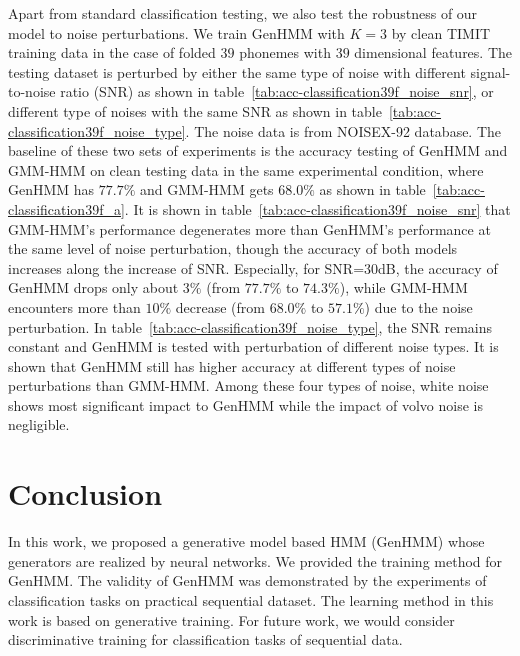 \documentclass{ecai}
\begin{document}
Apart from standard classification testing, we also test the robustness of our model to noise perturbations. We train GenHMM with $K=3$ by clean TIMIT training data in the case of folded $39$ phonemes with $39$ dimensional features. The testing dataset is perturbed by either the same type of noise with different signal-to-noise ratio (SNR) as shown in table~\ref{tab:acc-classification39f_noise_snr}, or different type of noises with the same SNR as shown in table~\ref{tab:acc-classification39f_noise_type}. The noise data is from NOISEX-92 database. The baseline of these two sets of experiments is the accuracy testing of GenHMM and GMM-HMM on clean testing data in the same experimental condition, where GenHMM has $77.7\%$ and GMM-HMM gets $68.0\%$ as shown in table~\ref{tab:acc-classification39f_a}. It is shown in table~\ref{tab:acc-classification39f_noise_snr} that GMM-HMM's performance degenerates more than GenHMM's performance at the same level of noise perturbation, though the accuracy of both models increases along the increase of SNR. Especially, for SNR=$30$dB, the accuracy of GenHMM drops only about $3\%$ (from $77.7\%$ to $74.3\%$), while GMM-HMM encounters more than $10\%$ decrease (from $68.0\%$ to $57.1\%$) due to the noise perturbation. In table~\ref{tab:acc-classification39f_noise_type}, the SNR remains constant and GenHMM is tested with perturbation of different noise types. It is shown that GenHMM still has higher accuracy at different types of noise perturbations than GMM-HMM. Among these four types of noise, white noise shows most significant impact to GenHMM while the impact of volvo noise is negligible.


\section{Conclusion}
In this work, we proposed a generative model based HMM (GenHMM) whose generators are realized by neural networks. We provided the training method for GenHMM. The validity of GenHMM was demonstrated by the experiments of classification tasks on practical sequential dataset. The learning method in this work is based on generative training. For future work, we would consider discriminative training for classification tasks of sequential data.



\end{document}
